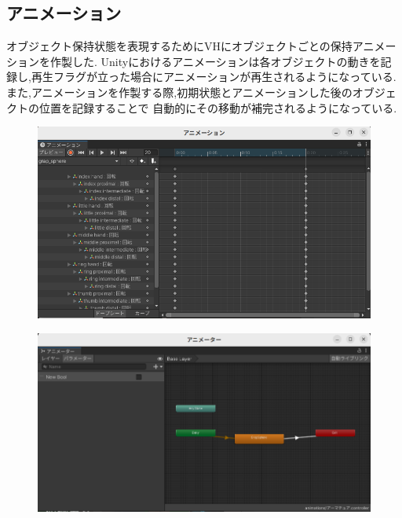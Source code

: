 \documentclass{ltjsreport}
\begin{document}
		\subsection{アニメーション}
			オブジェクト保持状態を表現するためにVHにオブジェクトごとの保持アニメーションを作製した.
			Unityにおけるアニメーションは各オブジェクトの動きを記録し,再生フラグが立った場合にアニメーションが再生されるようになっている.
			また,アニメーションを作製する際,初期状態とアニメーションした後のオブジェクトの位置を記録することで
			自動的にその移動が補完されるようになっている.
			\begin{figure}[H]
			\centering
			\includegraphics[width = 12cm]{../figs/animationclip.png}
			\caption{}
			\label{}
			\end{figure}

			\begin{figure}[H]
			\centering
			\includegraphics[width = 12cm]{../figs/animaterexample.png}
			\caption{}
			\label{}
			\end{figure}
			
\end{document}
